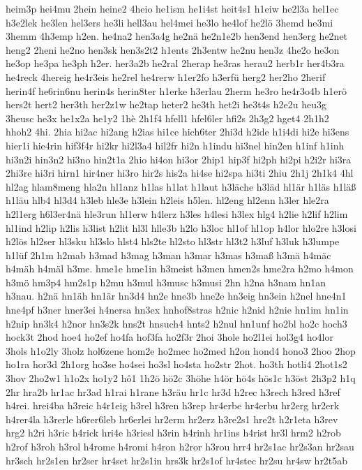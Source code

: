 {heim3p
hei4mu
2hein
heine2
4heio
he1ism
he1i4st
heit4s1
h1eiw
he2l3a
hel1ec
h3e2lek
he3len
hel3ers
he3li
hell3au
hel4mei
he3lo
he4lof
he2lö
3hemd
he3mi
3hemm
4h3emp
h2en.
he4na2
hen3a4g
he2nä
he2n1e2b
hen3end
hen3erg
he2net
heng2
2heni
he2no
hen3sk
hen3s2t2
h1ents
2h3entw
he2nu
hen3z
4he2o
he3on
he3op
he3pa
he3ph
h2er.
her3a2b
he2ral
2herap
he3ras
herau2
herb1r
her4b3ra
he4reck
4hereig
he4r3eis
he2rel
he4rerw
h1er2fo
h3erfü
herg2
her2ho
2herif
herin4f
he6rin6nu
herin4s
herin8ter
h1erke
h3erlau
2herm
he3ro
he4r3o4b
h1erö
hers2t
hert2
her3th
her2z1w
he2tap
heter2
he3th
het2i
he3t4s
h2e2u
heu3g
3heusc
he3x
he1x2a
he1y2
1hè
2h1f4
hfell1
hfel6ler
hfi2s
2h3g2
hget4
2h1h2
hhoh2
4hi.
2hia
hi2ac
hi2ang
h2ias
hi1ce
hich6ter
2hi3d
h2ide
h1i4di
hi2e
hi3ens
hier1i
hie4rin
hif3f4r
hi2kr
hi2l3a4
hil2fr
hi2n
h1indu
hi3nel
hin2en
h1inf
h1inh
hi3n2i
hin3n2
hi3no
hin2t1a
2hio
hi4on
hi3or
2hip1
hip3f
hi2ph
hi2pi
h2i2r
hi3ra
2hi3re
hi3ri
hirn1
hir4ner
hi3ro
hir2s
his2a
hi4se
hi2spa
hi3ti
2hiu
2h1j
2h1k4
4hl
hl2ag
hlam8meng
hla2n
hl1anz
h1las
h1lat
h1laut
h3läche
h3läd
hl1är
h1läs
h1läß
h1läu
hlb4
hl3d4
h3leb
hle3e
h3lein
h2leis
h5len.
hl2eng
hl2enn
h3ler
hle2ra
h2l1erg
h6l3er4nä
hle3run
hl1erw
h4lerz
h3les
h4lesi
h3lex
hlg4
h2lie
h2lif
h2lim
hl1ind
h2lip
h2lis
h3list
h2lit
hl3l
hlle3b
h2lo
h3loc
hl1of
hl1op
h4lor
hlo2re
h3losi
h2lös
hl2ser
hl3sku
hl3slo
hlst4
hls2te
hl2sto
hl3str
hl3t2
h3luf
h3luk
h3lumpe
h1lüf
2h1m
h2mab
h3mad
h3mag
h3man
h3mar
h3mas
h3maß
h3mä
h4mäc
h4mäh
h4mäl
h3me.
hme1e
hme1in
h3meist
h3men
hmen2s
hme2ra
h2mo
h4mon
h3mö
hm3p4
hm2s1p
h2mu
h3mul
h3musc
h3musi
2hn
h2na
h3nam
hn1an
h3nau.
h2nä
hn1äh
hn1är
hn3d4
hn2e
hne3b
hne2e
hn3eig
hn3ein
h2nel
hne4n1
hne4pf
h3ner
hner3ei
h4nersa
hn3ex
hnhof8stras
h2nic
h2nid
h2nie
hn1im
hn1in
h2nip
hn3k4
h2nor
hn3s2k
hns2t
hnsuch4
hnts2
h2nul
hn1unf
ho2bl
ho2c
hoch3
hock3t
2hod
hoe4
ho2ef
ho4fa
hof3fa
ho2f3r
2hoi
3hole
ho2l1ei
hol3g4
ho4lor
3hols
h1o2ly
3holz
hol6zene
hom2e
ho2mec
ho2med
h2on
hond4
hono3
2hoo
2hop
ho1ra
hor3d
2h1org
ho3se
ho4sei
ho3sl
ho4sta
ho2str
2hot.
ho3th
hotli4
2hot1s2
3hov
2ho2w1
h1o2x
ho1y2
hô1
1h2ö
hö2c
3höhe
h4ör
hö4s
hös1c
h3öst
2h3p2
h1q
2hr
hra2b
hr1ac
hr3ad
h1rai
h1rane
h3räu
hr1c
hr3d
h2rec
h3rech
h3red
h3ref
h4rei.
hrei4ba
h3reic
h4r1eig
h3rel
h3ren
h3rep
hr4erbe
hr4erbu
hr2erg
hr2erk
h4rer4la
h3rerle
h6rer6leb
hr6erlei
hr2erm
hr2erz
h3re2s1
hre2t
h2r1eta
h3rev
hrg2
h2ri
h3ric
h4rick
hri4e
h3riesl
h3rin
h4rinh
hr1ins
h4rist
hr3l
hrm2
h2rob
h2rof
h3roh
h3rol
h4rome
h4romi
h4ron
h2ror
h3rou
hrr4
hr2s1ac
hr2s3an
hr2sau
hr3sch
hr2s1en
hr2ser
hr4set
hr2s1in
hrs3k
hr2s1of
hr4stec
hr2su
hr4sw
hr2t5ab
}
